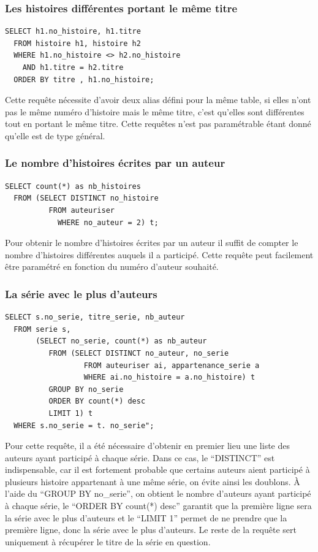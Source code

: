 \documentclass[12pt]{article}
\begin{document}
\subsubsection*{Les histoires différentes portant le même titre}
\begin{lstlisting}
SELECT h1.no_histoire, h1.titre
  FROM histoire h1, histoire h2
  WHERE h1.no_histoire <> h2.no_histoire
    AND h1.titre = h2.titre
  ORDER BY titre , h1.no_histoire;
\end{lstlisting}
Cette requête nécessite d'avoir deux alias défini pour la même table, si
elles n'ont pas le même numéro d'histoire mais le même titre, c'est qu'elles
sont différentes tout en portant le même titre. Cette requêtes n'est pas
paramétrable étant donné qu'elle est de type général.

\subsubsection*{Le nombre d'histoires écrites par un auteur}
\begin{lstlisting}
SELECT count(*) as nb_histoires
  FROM (SELECT DISTINCT no_histoire
          FROM auteuriser
	        WHERE no_auteur = 2) t;
\end{lstlisting}
Pour obtenir le nombre d'histoires écrites par un auteur il suffit de compter
le nombre d'histoires différentes auquels il a participé. Cette requête peut
facilement être paramétré en fonction du numéro d'auteur souhaité.

\subsubsection*{La série avec le plus d'auteurs}
\begin{lstlisting}
SELECT s.no_serie, titre_serie, nb_auteur
  FROM serie s,
       (SELECT no_serie, count(*) as nb_auteur
          FROM (SELECT DISTINCT no_auteur, no_serie
                  FROM auteuriser ai, appartenance_serie a
                  WHERE ai.no_histoire = a.no_histoire) t
          GROUP BY no_serie
          ORDER BY count(*) desc
          LIMIT 1) t
  WHERE s.no_serie = t. no_serie";
\end{lstlisting}
Pour cette requête, il a été nécessaire d'obtenir en premier lieu une liste
des auteurs ayant participé à chaque série. Dans ce cas, le ``DISTINCT'' est
indispensable, car il est fortement probable que certains auteurs aient
participé à plusieurs histoire appartenant à une même série, on évite ainsi
les doublons. À l'aide du ``GROUP BY no\_serie'', on obtient le nombre
d'auteurs ayant participé à chaque série, le ``ORDER BY count(*) desc''
garantit que la première ligne sera la série avec le plus d'auteurs et le
``LIMIT 1'' permet de ne prendre que la première ligne, donc la série avec
le plus d'auteurs. Le reste de la requête sert uniquement à récupérer le
titre de la série en question.
\end{document}
